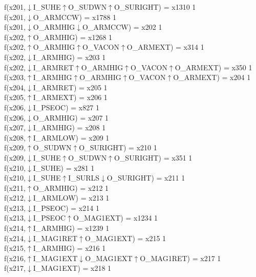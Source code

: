 f(x201,$\downarrow$I\_SUHE$\uparrow$O\_SUDWN$\uparrow$O\_SURIGHT) = x1310 {1} \\
f(x201,$\downarrow$O\_ARMCCW) = x1788 {1} \\
f(x201,$\downarrow$O\_ARMHIG$\downarrow$O\_ARMCCW) = x202 {1} \\
f(x202,$\uparrow$O\_ARMHIG) = x1268 {1} \\
f(x202,$\uparrow$O\_ARMHIG$\uparrow$O\_VACON$\uparrow$O\_ARMEXT) = x314 {1} \\
f(x202,$\downarrow$I\_ARMHIG) = x203 {1} \\
f(x202,$\downarrow$I\_ARMRET$\uparrow$O\_ARMHIG$\uparrow$O\_VACON$\uparrow$O\_ARMEXT) = x350 {1} \\
f(x203,$\uparrow$I\_ARMHIG$\uparrow$O\_ARMHIG$\uparrow$O\_VACON$\uparrow$O\_ARMEXT) = x204 {1} \\
f(x204,$\downarrow$I\_ARMRET) = x205 {1} \\
f(x205,$\uparrow$I\_ARMEXT) = x206 {1} \\
f(x206,$\downarrow$I\_PSEOC) = x827 {1} \\
f(x206,$\downarrow$O\_ARMHIG) = x207 {1} \\
f(x207,$\downarrow$I\_ARMHIG) = x208 {1} \\
f(x208,$\uparrow$I\_ARMLOW) = x209 {1} \\
f(x209,$\uparrow$O\_SUDWN$\uparrow$O\_SURIGHT) = x210 {1} \\
f(x209,$\downarrow$I\_SUHE$\uparrow$O\_SUDWN$\uparrow$O\_SURIGHT) = x351 {1} \\
f(x210,$\downarrow$I\_SUHE) = x281 {1} \\
f(x210,$\downarrow$I\_SUHE$\uparrow$I\_SURLS$\downarrow$O\_SURIGHT) = x211 {1} \\
f(x211,$\uparrow$O\_ARMHIG) = x212 {1} \\
f(x212,$\downarrow$I\_ARMLOW) = x213 {1} \\
f(x213,$\downarrow$I\_PSEOC) = x214 {1} \\
f(x213,$\downarrow$I\_PSEOC$\uparrow$O\_MAG1EXT) = x1234 {1} \\
f(x214,$\uparrow$I\_ARMHIG) = x1239 {1} \\
f(x214,$\downarrow$I\_MAG1RET$\uparrow$O\_MAG1EXT) = x215 {1} \\
f(x215,$\uparrow$I\_ARMHIG) = x216 {1} \\
f(x216,$\uparrow$I\_MAG1EXT$\downarrow$O\_MAG1EXT$\uparrow$O\_MAG1RET) = x217 {1} \\
f(x217,$\downarrow$I\_MAG1EXT) = x218 {1} \\
